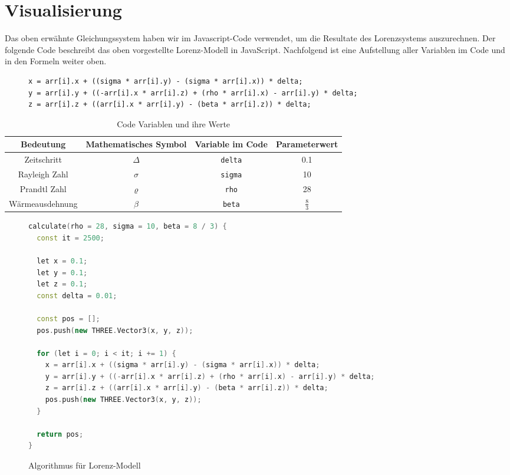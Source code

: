 
\section{Visualisierung}\label{visualisierung}
Das oben erwähnte Gleichungssystem haben wir im Javascript-Code verwendet, um die Resultate des Lorenzsystems auszurechnen. Der folgende Code beschreibt das oben vorgestellte Lorenz-Modell in JavaScript. Nachfolgend ist eine Aufstellung aller Variablen im Code und in den Formeln weiter oben.

\begin{figure}
	\begin{lstlisting}[style=C]
x = arr[i].x + ((sigma * arr[i].y) - (sigma * arr[i].x)) * delta;
y = arr[i].y + ((-arr[i].x * arr[i].z) + (rho * arr[i].x) - arr[i].y) * delta;
z = arr[i].z + ((arr[i].x * arr[i].y) - (beta * arr[i].z)) * delta;
		\end{lstlisting}
\end{figure}

	\begin{table}[]
		\centering
		\begin{tabular}{| c | c | c | c |}
			\hline
			\textbf{Bedeutung} & \textbf{Mathematisches Symbol} & \textbf{Variable im Code} & \textbf{Parameterwert}\\\hline
			Zeitschritt & $ \Delta $ & \texttt{delta} & 0.1 \\\hline
			Rayleigh Zahl & $ \sigma $ & \texttt{sigma} & 10 \\\hline
			Prandtl Zahl & $\varrho $ & \texttt{rho} & 28 \\\hline
			Wärmeausdehnung & $\beta $ & \texttt{beta}  & $ \frac{8}{3} $ \\\hline
		\end{tabular}
		\caption{Code Variablen und ihre Werte\label{CodeVariablen}}
	\end{table}

\begin{figure}
	\begin{lstlisting}[style=C, language=C++]
calculate(rho = 28, sigma = 10, beta = 8 / 3) {
  const it = 2500;

  let x = 0.1;
  let y = 0.1;
  let z = 0.1;
  const delta = 0.01;

  const pos = [];
  pos.push(new THREE.Vector3(x, y, z));

  for (let i = 0; i < it; i += 1) {
	x = arr[i].x + ((sigma * arr[i].y) - (sigma * arr[i].x)) * delta;
	y = arr[i].y + ((-arr[i].x * arr[i].z) + (rho * arr[i].x) - arr[i].y) * delta;
	z = arr[i].z + ((arr[i].x * arr[i].y) - (beta * arr[i].z)) * delta;
	pos.push(new THREE.Vector3(x, y, z));
  }

  return pos;
}
		\end{lstlisting}
		\caption{Algorithmus für Lorenz-Modell\label{AlgorithmusLorenz}}
\end{figure}

